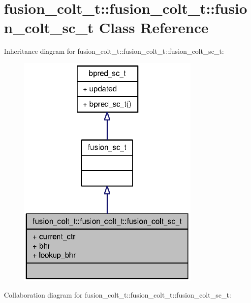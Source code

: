 \section{fusion\_\-colt\_\-t::fusion\_\-colt\_\-t::fusion\_\-colt\_\-sc\_\-t Class Reference}
\label{classfusion__colt__t_1_1fusion__colt__sc__t}
Inheritance diagram for fusion\_\-colt\_\-t::fusion\_\-colt\_\-t::fusion\_\-colt\_\-sc\_\-t:\nopagebreak
\begin{figure}[H]
\begin{center}
\leavevmode
\includegraphics[width=254pt]{classfusion__colt__t_1_1fusion__colt__sc__t__inherit__graph}
\end{center}
\end{figure}
Collaboration diagram for fusion\_\-colt\_\-t::fusion\_\-colt\_\-t::fusion\_\-colt\_\-sc\_\-t:\nopagebreak
